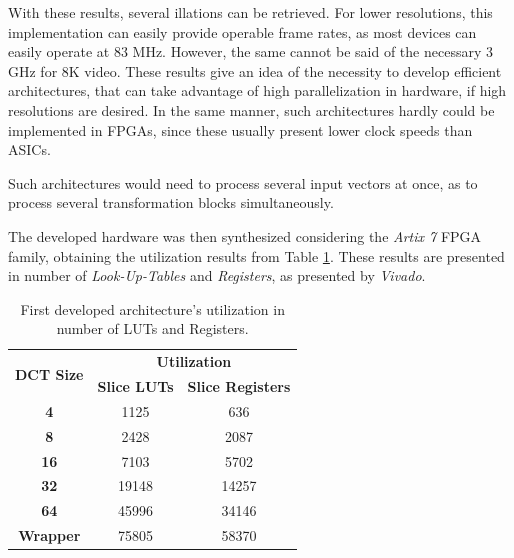 With these results, several illations can be retrieved. For lower resolutions, this implementation can easily provide operable frame rates, as most devices can easily operate at 83 MHz. However, the same cannot be said of the necessary 3 GHz for 8K video. These results give an idea of the necessity to develop efficient architectures, that can take advantage of high parallelization in hardware, if high resolutions are desired. In the same manner, such architectures hardly could be implemented in FPGAs, since these usually present lower clock speeds than ASICs.

Such architectures would need to process several input vectors at once, as to process several transformation blocks simultaneously.

The developed hardware was then synthesized considering the \emph{Artix 7} FPGA family, obtaining the utilization results from Table \ref{tab:v1results}. These results are presented in number of \emph{Look-Up-Tables} and \emph{Registers}, as presented by \emph{Vivado}.

\begin{table}[!htpb]
    \centering
    \caption{First developed architecture's utilization in number of LUTs and Registers.}
    \begin{tabular}{ccc} \toprule
        \multirow{2}{*}{\textbf{DCT Size}} &     \multicolumn{2}{c}{\textbf{Utilization}} \\
         &      \textbf{Slice LUTs} &      \textbf{Slice Registers} \\ \toprule
        \textbf{4} &    1125  &       636  \\ \hline
        \textbf{8} &    2428  &       2087  \\ \hline
        \textbf{16} &   7103  &      5702  \\ \hline
        \textbf{32} &   19148  &     14257  \\ \hline
        \textbf{64} &   45996  &    34146  \\ \bottomrule        
        \textbf{Wrapper} & 75805  & 58370  \\
        \bottomrule
    \end{tabular}    
    \label{tab:v1results}
\end{table}


